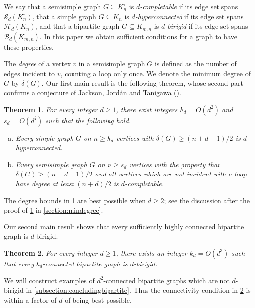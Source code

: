 \documentclass[11pt,a4paper,dvipsnames]{scrartcl}
\newtheorem{theorem}{Theorem}[section]
\newcommand{\cB}{{\mathcal{B}}}
\newcommand{\cS}{{\mathcal{S}}}
\newcommand{\cH}{{\mathcal{H}}}
\newcommand{\locallycompletable}[1]{$d$-completable}
\begin{document}
We say that a semisimple graph $G\subseteq K_n^\circ$  is {\em \locallycompletable{d}} if its edge set spans $\cS_d(K_n^\circ)$, that   a simple graph $G\subseteq K_n$  is {\em $d$-hyperconnected} if its edge set spans $\cH_d(K_n)$, and that a bipartite graph $G\subseteq K_{m,n}$  is {\em $d$-birigid}  if its edge set spans $\cB_d(K_{m,n})$. In this paper we obtain sufficient conditions for a graph to have these properties.

The \emph{degree} of a vertex $v$ in a semisimple graph $G$ is defined as the number of edges incident to $v$, counting a loop only once. We denote the minimum degree of $G$ by $\delta(G)$.
Our first main result is the following theorem, whose second part confirms a conjecture of Jackson, Jordán and Tanigawa (\cite[Conjecture 38]{JJT2}). 

\begin{theorem}\label{thm:mindegree}
    For every integer $d\geq 1$, there exist integers $h_d = O(d^2)$ and $s_d = O(d^2)$ such that the following hold.
    \begin{enumerate}[(a)]
        \item Every simple graph  $G$ on $n \geq h_d$ vertices with $\delta(G)\geq (n+d - 1)/2$ is $d$-hyperconnected. 
        \item Every semisimple graph $G$ on $n \geq s_d$ vertices with the property that $\delta(G) \geq (n+d-1)/2$ and all vertices which are not incident with a loop have degree at least $ (n+d)/2$ is $d$-completable. 
    \end{enumerate}
\end{theorem}

\noindent
The degree bounds in \cref{thm:mindegree} are best possible when $d \geq 2$; see the discussion after the proof of \cref{thm:mindegree} in \cref{section:mindegree}. %

Our second main result shows that every sufficiently highly connected bipartite graph is $d$-birigid. 

 

\begin{theorem}\label{thm:main} For every integer $d\geq 1$, there exists an integer $k_d=O(d^3)$ such that every $k_d$-connected bipartite graph is $d$-birigid.
\end{theorem}

\noindent
We  will construct examples of $d^2$-connected bipartite graphs which are not $d$-birigid in \cref{subsection:concludingbipartite}. Thus the connectivity condition in \cref{thm:main} is within a factor of $d$ of being best possible.
\end{document}
